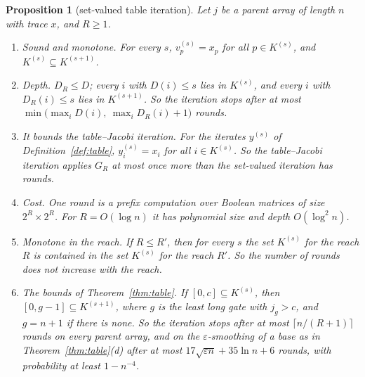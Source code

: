 \documentclass[11pt]{amsart}
\newtheorem{proposition}[theorem]{Proposition}
\theoremstyle{definition}
\theoremstyle{remark}
\newcommand{\eps}{\varepsilon}
\begin{document}
\begin{proposition}[set-valued table iteration]\label{prop:setval}
Let $j$ be a parent array of length $n$ with trace $x$, and $R\ge1$.
\begin{enumerate}[label=(\alph*),leftmargin=2.4em]
\item \emph{Sound and monotone.} For every $s$, $v^{(s)}_p=x_p$ for all $p\in K^{(s)}$, and
$K^{(s)}\subseteq K^{(s+1)}$.
\item \emph{Depth.} $D_R\le D$; every $i$ with $D(i)\le s$ lies in $K^{(s)}$, and every $i$ with
$D_R(i)\le s$ lies in $K^{(s+1)}$. So the iteration stops after at most
$\min\bigl(\max_iD(i),\ \max_iD_R(i)+1\bigr)$ rounds.
\item \emph{It bounds the table--Jacobi iteration.} For the iterates $y^{(s)}$ of
Definition~\ref{def:table}, $y^{(s)}_i=x_i$ for all $i\in K^{(s)}$. So the table--Jacobi iteration
applies $G_R$ at most once more than the set-valued iteration has rounds.
\item \emph{Cost.} One round is a prefix computation over Boolean matrices of size
$2^R\times2^R$. For $R=O(\log n)$ it has polynomial size and depth $O(\log^2n)$.
\item \emph{Monotone in the reach.} If $R\le R'$, then for every $s$ the set $K^{(s)}$ for the
reach $R$ is contained in the set $K^{(s)}$ for the reach $R'$. So the number of rounds does not
increase with the reach.
\item \emph{The bounds of Theorem~\ref{thm:table}.} If $[0,c]\subseteq K^{(s)}$, then
$[0,g-1]\subseteq K^{(s+1)}$, where $g$ is the least long gate with $j_g>c$, and $g=n+1$ if there
is none. So the iteration stops after at most $\lceil n/(R+1)\rceil$ rounds on every parent
array, and on the $\eps$-smoothing of a base as in Theorem~\ref{thm:table}(d) after at most
$17\sqrt{\eps n}+35\ln n+6$ rounds, with probability at least $1-n^{-4}$.
\end{enumerate}
\end{proposition}
\end{document}
